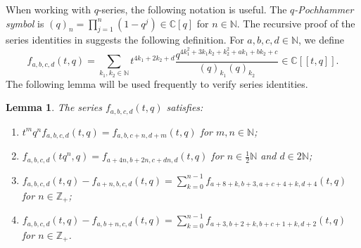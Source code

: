 \documentclass[a4paper, 12pt, reqno]{amsart}
\newtheorem{lemma}[theorem]{Lemma}
\theoremstyle{remark}
\begin{document}
When working with $q$-series, the following notation is useful.
The \emph{$q$-Pochhammer symbol} is $(q)_n = \prod_{j = 1}^n(1 - q^j) \in \mathbb{C}[q]$ for $n \in \mathbb{N}$.
The recursive proof of the series identities in \cite{andrews_singular_2022} suggests the following definition.
For $a, b, c, d \in \mathbb{N}$, we define
\begin{equation*}
  f_{a, b, c, d}(t, q) = \sum_{k_1, k_2 \in \mathbb{N}}t^{4k_1 + 2k_2 + d}\frac{q^{4k_1^2 + 3k_1k_2 + k_2^2 + ak_1 + bk_2 + c}}{(q)_{k_1}(q)_{k_2}} \in \mathbb{C}[[t, q]].
\end{equation*}
The following lemma will be used frequently to verify series identities.

\begin{lemma}
  \label{lmm:29}
  The series $f_{a, b, c, d}(t, q)$ satisfies:
  \begin{enumerate}
  \item $t^mq^nf_{a, b, c, d}(t, q) = f_{a, b, c + n, d + m}(t, q)$ for $m, n \in \mathbb{N}$;
  \item $f_{a, b, c, d}(tq^n, q) = f_{a + 4n, b + 2n, c + dn, d}(t, q)$ for $n \in \frac{1}{2}\mathbb{N}$ and $d \in 2\mathbb{N}$;
  \item $f_{a, b, c, d}(t, q) - f_{a + n, b, c, d}(t, q) = \sum_{k = 0}^{n - 1}f_{a + 8 + k, b + 3, a + c + 4 + k, d + 4}(t, q)$ for $n \in \mathbb{Z}_+$;
  \item $f_{a, b, c, d}(t, q) - f_{a, b + n, c, d}(t, q) = \sum_{k = 0}^{n - 1}f_{a + 3, b + 2 + k, b + c + 1 + k, d + 2}(t, q)$ for $n \in \mathbb{Z}_+$.
  \end{enumerate}
\end{lemma}
\end{document}
